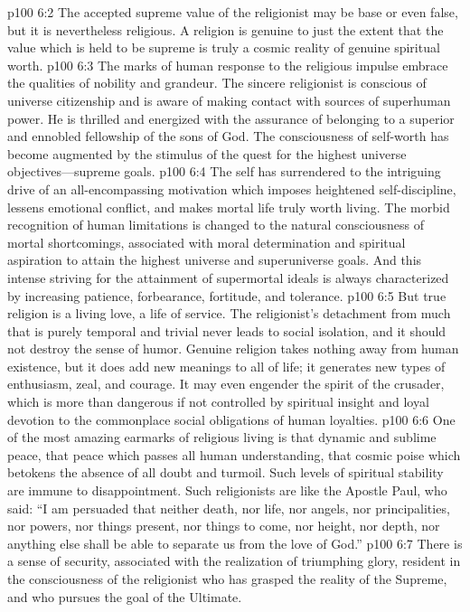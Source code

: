\vs p100 6:2 The accepted supreme value of the religionist may be base or even false, but it is nevertheless religious. A religion is genuine to just the extent that the value which is held to be supreme is truly a cosmic reality of genuine spiritual worth.
\vs p100 6:3 The marks of human response to the religious impulse embrace the qualities of nobility and grandeur. The sincere religionist is conscious of universe citizenship and is aware of making contact with sources of superhuman power. He is thrilled and energized with the assurance of belonging to a superior and ennobled fellowship of the sons of God. The consciousness of self\hyp{}worth has become augmented by the stimulus of the quest for the highest universe objectives---supreme goals.
\vs p100 6:4 The self has surrendered to the intriguing drive of an all\hyp{}encompassing motivation which imposes heightened self\hyp{}discipline, lessens emotional conflict, and makes mortal life truly worth living. The morbid recognition of human limitations is changed to the natural consciousness of mortal shortcomings, associated with moral determination and spiritual aspiration to attain the highest universe and superuniverse goals. And this intense striving for the attainment of supermortal ideals is always characterized by increasing patience, forbearance, fortitude, and tolerance.
\vs p100 6:5 But true religion is a living love, a life of service. The religionist’s detachment from much that is purely temporal and trivial never leads to social isolation, and it should not destroy the sense of humor. Genuine religion takes nothing away from human existence, but it does add new meanings to all of life; it generates new types of enthusiasm, zeal, and courage. It may even engender the spirit of the crusader, which is more than dangerous if not controlled by spiritual insight and loyal devotion to the commonplace social obligations of human loyalties.
\pc \vs p100 6:6 One of the most amazing earmarks of religious living is that dynamic and sublime peace, that peace which passes all human understanding, that cosmic poise which betokens the absence of all doubt and turmoil. Such levels of spiritual stability are immune to disappointment. Such religionists are like the Apostle Paul, who said: “I am persuaded that neither death, nor life, nor angels, nor principalities, nor powers, nor things present, nor things to come, nor height, nor depth, nor anything else shall be able to separate us from the love of God.”
\vs p100 6:7 There is a sense of security, associated with the realization of triumphing glory, resident in the consciousness of the religionist who has grasped the reality of the Supreme, and who pursues the goal of the Ultimate.
